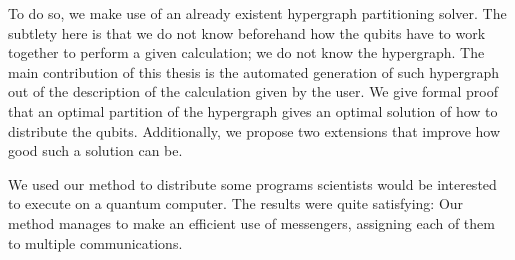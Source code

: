 To do so, we make use of an already existent hypergraph partitioning solver. The subtlety here is that we do not know beforehand how the qubits have to work together to perform a given calculation; we do not know the hypergraph. The main contribution of this thesis is the automated generation of such hypergraph out of the description of the calculation given by the user. We give formal proof that an optimal partition of the hypergraph gives an optimal solution of how to distribute the qubits. Additionally, we propose two extensions that improve how good such a solution can be. %

We used our method to distribute some programs scientists would be interested to execute on a quantum computer. The results were quite satisfying: Our method manages to make an efficient use of messengers, assigning each of them to multiple communications.